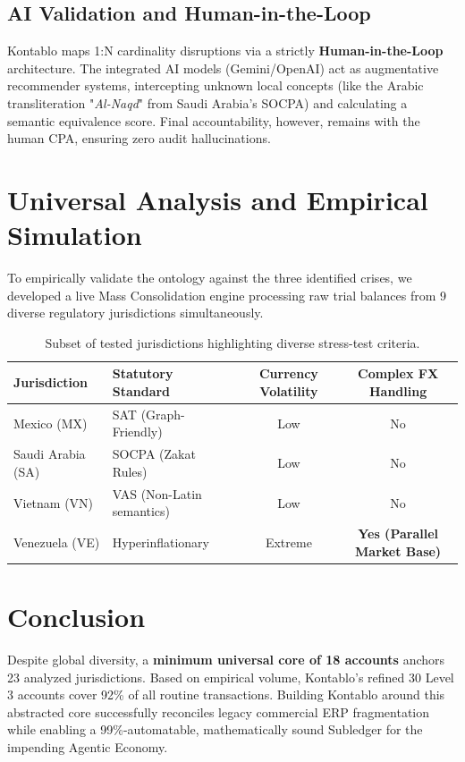 \documentclass[12pt]{article}
\begin{document}
\subsection{AI Validation and Human-in-the-Loop}
Kontablo maps 1:N cardinality disruptions via a strictly \textbf{Human-in-the-Loop} architecture. The integrated AI models (Gemini/OpenAI) act as augmentative recommender systems, intercepting unknown local concepts (like the Arabic transliteration "\textit{Al-Naqd}" from Saudi Arabia's SOCPA) and calculating a semantic equivalence score. Final accountability, however, remains with the human CPA, ensuring zero audit hallucinations.

\section{Universal Analysis and Empirical Simulation}

To empirically validate the ontology against the three identified crises, we developed a live Mass Consolidation engine processing raw trial balances from 9 diverse regulatory jurisdictions simultaneously. 

\begin{table}[ht]
\centering
\begin{tabular}{@{}llcc@{}}
\toprule
\textbf{Jurisdiction} & \textbf{Statutory Standard} & \textbf{Currency Volatility} & \textbf{Complex FX Handling} \\ \midrule
Mexico (MX) & SAT (Graph-Friendly) & Low & No \\
Saudi Arabia (SA) & SOCPA (Zakat Rules) & Low & No \\
Vietnam (VN) & VAS (Non-Latin semantics) & Low & No \\
Venezuela (VE) & Hyperinflationary & Extreme & \textbf{Yes (Parallel Market Base)} \\ \bottomrule
\end{tabular}
\caption{Subset of tested jurisdictions highlighting diverse stress-test criteria.}
\label{tab:simulation}
\end{table}

\section{Conclusion}
Despite global diversity, a \textbf{minimum universal core of 18 accounts} anchors 23 analyzed jurisdictions. Based on empirical volume, Kontablo's refined 30 Level 3 accounts cover 92\% of all routine transactions. Building Kontablo around this abstracted core successfully reconciles legacy commercial ERP fragmentation while enabling a 99\%-automatable, mathematically sound Subledger for the impending Agentic Economy.
\end{document}

